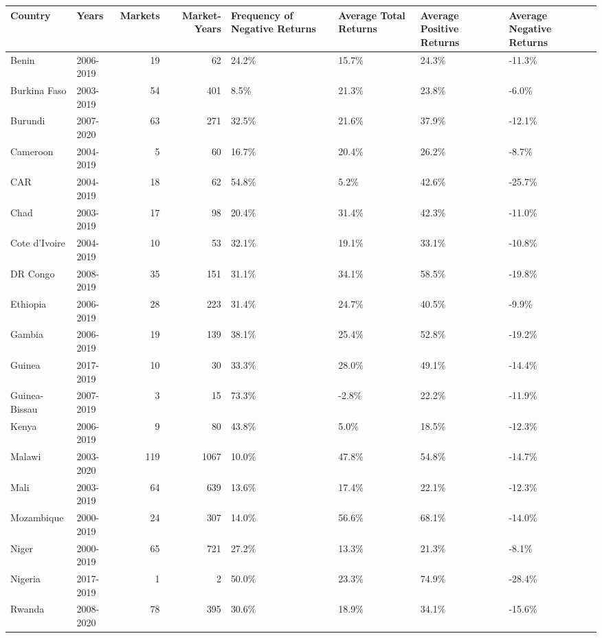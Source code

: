 \begin{table}[ht]
\centering
\begin{tabular}{llrrllll}
  \hline
Country & Years & Markets & Market-Years & Frequency of Negative Returns & Average Total Returns & Average Positive Returns & Average Negative Returns \\ 
  \hline
Benin & 2006-2019 &  19 &  62 & 24.2\% & 15.7\% & 24.3\% & -11.3\% \\ 
  Burkina Faso & 2003-2019 &  54 & 401 & 8.5\% & 21.3\% & 23.8\% & -6.0\% \\ 
  Burundi & 2007-2020 &  63 & 271 & 32.5\% & 21.6\% & 37.9\% & -12.1\% \\ 
  Cameroon & 2004-2019 &   5 &  60 & 16.7\% & 20.4\% & 26.2\% & -8.7\% \\ 
  CAR & 2004-2019 &  18 &  62 & 54.8\% & 5.2\% & 42.6\% & -25.7\% \\ 
  Chad & 2003-2019 &  17 &  98 & 20.4\% & 31.4\% & 42.3\% & -11.0\% \\ 
  Cote d'Ivoire & 2004-2019 &  10 &  53 & 32.1\% & 19.1\% & 33.1\% & -10.8\% \\ 
  DR Congo & 2008-2019 &  35 & 151 & 31.1\% & 34.1\% & 58.5\% & -19.8\% \\ 
  Ethiopia & 2006-2019 &  28 & 223 & 31.4\% & 24.7\% & 40.5\% & -9.9\% \\ 
  Gambia & 2006-2019 &  19 & 139 & 38.1\% & 25.4\% & 52.8\% & -19.2\% \\ 
  Guinea & 2017-2019 &  10 &  30 & 33.3\% & 28.0\% & 49.1\% & -14.4\% \\ 
  Guinea-Bissau & 2007-2019 &   3 &  15 & 73.3\% & -2.8\% & 22.2\% & -11.9\% \\ 
  Kenya & 2006-2019 &   9 &  80 & 43.8\% & 5.0\% & 18.5\% & -12.3\% \\ 
  Malawi & 2003-2020 & 119 & 1067 & 10.0\% & 47.8\% & 54.8\% & -14.7\% \\ 
  Mali & 2003-2019 &  64 & 639 & 13.6\% & 17.4\% & 22.1\% & -12.3\% \\ 
  Mozambique & 2000-2019 &  24 & 307 & 14.0\% & 56.6\% & 68.1\% & -14.0\% \\ 
  Niger & 2000-2019 &  65 & 721 & 27.2\% & 13.3\% & 21.3\% & -8.1\% \\ 
  Nigeria & 2017-2019 &   1 &   2 & 50.0\% & 23.3\% & 74.9\% & -28.4\% \\ 
  Rwanda & 2008-2020 &  78 & 395 & 30.6\% & 18.9\% & 34.1\% & -15.6\% \\ 

\end{tabular}
\end{table}
